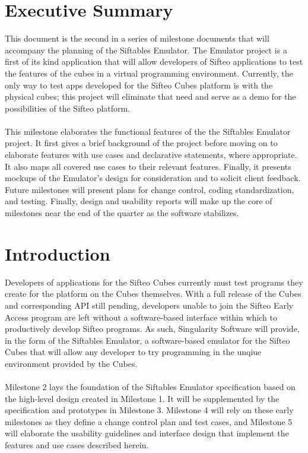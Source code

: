 \documentclass[12pt]{article}
\begin{document}
\section{Executive Summary}
This document is the second in a series of milestone documents that will accompany the planning of the Siftables Emulator. The Emulator project is a first of its kind application that will allow developers of Sifteo applications to test the features of the cubes in a virtual programming environment. Currently, the only way to test apps developed for the Sifteo Cubes platform is with the physical cubes; this project will eliminate that need and serve as a demo for the possibilities of the Sifteo platform.\\\\
This milestone elaborates the functional features of the the Siftables Emulator project. It first gives a brief background of the project before moving on to elaborate features with use cases and declarative statements, where appropriate. It also maps all covered use cases to their relevant features. Finally, it presents mockups of the Emulator's design for consideration and to solicit client feedback.  Future milestones will present plans for change control, coding standardization, and testing. Finally, design and usability reports will make up the core of milestones near the end of the quarter as the software stabilizes.


\section{Introduction}
Developers of applications for the \gls{Sifteo Cubes} currently must test programs they create for the platform on the Cubes themselves.  With a full release of the Cubes and corresponding \gls{API} still pending, developers unable to join the Sifteo Early Access program are left without a software-based interface within which to productively develop Sifteo programs. As such, Singularity Software will provide, in the form of the Siftables Emulator, a software-based emulator for the Sifteo Cubes that will allow any developer to try programming in the unqiue environment provided by the Cubes.\\\\
Milestone 2 lays the foundation of the Siftables Emulator specification based on the high-level design created in Milestone 1. It will be supplemented by the specification and prototypes in Milestone 3. Milestone 4 will rely on these early milestones as they define a change control plan and test cases, and Milestone 5 will elaborate the usability guidelines and interface design that implement the features and use cases described herein.
\end{document}
